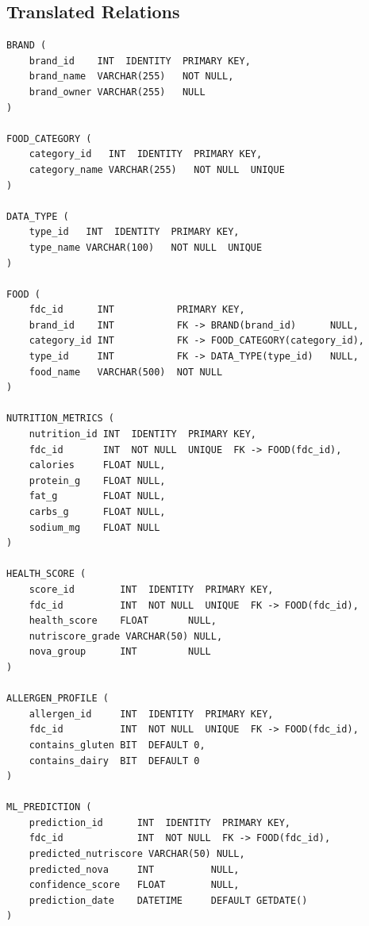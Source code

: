 \documentclass[12pt,a4paper]{article}
\begin{document}
\subsection{Translated Relations}

\begin{sqlbox}
\small
\begin{verbatim}
BRAND (
    brand_id    INT  IDENTITY  PRIMARY KEY,
    brand_name  VARCHAR(255)   NOT NULL,
    brand_owner VARCHAR(255)   NULL
)

FOOD_CATEGORY (
    category_id   INT  IDENTITY  PRIMARY KEY,
    category_name VARCHAR(255)   NOT NULL  UNIQUE
)

DATA_TYPE (
    type_id   INT  IDENTITY  PRIMARY KEY,
    type_name VARCHAR(100)   NOT NULL  UNIQUE
)

FOOD (
    fdc_id      INT           PRIMARY KEY,
    brand_id    INT           FK -> BRAND(brand_id)      NULL,
    category_id INT           FK -> FOOD_CATEGORY(category_id),
    type_id     INT           FK -> DATA_TYPE(type_id)   NULL,
    food_name   VARCHAR(500)  NOT NULL
)

NUTRITION_METRICS (
    nutrition_id INT  IDENTITY  PRIMARY KEY,
    fdc_id       INT  NOT NULL  UNIQUE  FK -> FOOD(fdc_id),
    calories     FLOAT NULL,
    protein_g    FLOAT NULL,
    fat_g        FLOAT NULL,
    carbs_g      FLOAT NULL,
    sodium_mg    FLOAT NULL
)

HEALTH_SCORE (
    score_id        INT  IDENTITY  PRIMARY KEY,
    fdc_id          INT  NOT NULL  UNIQUE  FK -> FOOD(fdc_id),
    health_score    FLOAT       NULL,
    nutriscore_grade VARCHAR(50) NULL,
    nova_group      INT         NULL
)

ALLERGEN_PROFILE (
    allergen_id     INT  IDENTITY  PRIMARY KEY,
    fdc_id          INT  NOT NULL  UNIQUE  FK -> FOOD(fdc_id),
    contains_gluten BIT  DEFAULT 0,
    contains_dairy  BIT  DEFAULT 0
)

ML_PREDICTION (
    prediction_id      INT  IDENTITY  PRIMARY KEY,
    fdc_id             INT  NOT NULL  FK -> FOOD(fdc_id),
    predicted_nutriscore VARCHAR(50) NULL,
    predicted_nova     INT          NULL,
    confidence_score   FLOAT        NULL,
    prediction_date    DATETIME     DEFAULT GETDATE()
)
\end{verbatim}
\end{sqlbox}
\end{document}
